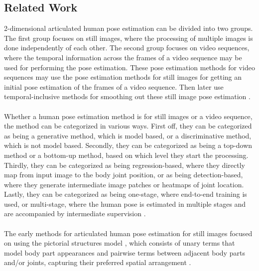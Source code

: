 \documentclass[./main.tex]{subfiles}
\begin{document}
\subsection{Related Work}
\label{subsec:related_work}
2-dimensional articulated human pose estimation can be divided into two groups. The first group focuses on still images, where the processing of multiple images is done independently of each other. The second group focuses on video sequences, where the temporal information across the frames of a video sequence may be used for performing the pose estimation. These pose estimation methods for video sequences may use the pose estimation methods for still images for getting an initial pose estimation of the frames of a video sequence. Then later use temporal-inclusive methods for smoothing out these still image pose estimation \cite{Chen_2020}.
\\
\\
Whether a human pose estimation method is for still images or a video sequence, the method can be categorized in various ways. First off, they can be categorized as being a generative method, which is model based, or a discriminative method, which is not model based. Secondly, they can be categorized as being a top-down method or a bottom-up method, based on which level they start the processing. Thirdly, they can be categorized as being regression-based, where they directly map from input image to the body joint position, or as being detection-based, where they generate intermediate image patches or heatmaps of joint location. Lastly, they can be categorized as being one-stage, where end-to-end training is used, or multi-stage, where the human pose is estimated in multiple stages and are accompanied by intermediate supervision \cite{Chen_2020}.
\\
\\
The early methods for articulated human pose estimation for still images focused on using the pictorial structures model \cite{fischler1973representation}, which consists of unary terms that model body part appearances and pairwise terms between adjacent body parts and/or joints, capturing their preferred spatial arrangement \cite{Pishchulin_2013_CVPR, andriluka2012discriminative, johnson2011learning, yang2011articulated}.
\\
\\
\end{document}
